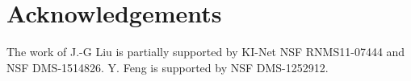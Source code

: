 \documentclass[12pt]{amsart}%
\theoremstyle{definition}
\theoremstyle{remark}
\begin{document}
\section*{Acknowledgements}
The work of J.-G Liu is partially supported by KI-Net NSF RNMS11-07444 and NSF DMS-1514826. Y. Feng is supported by NSF DMS-1252912.

\end{document}
